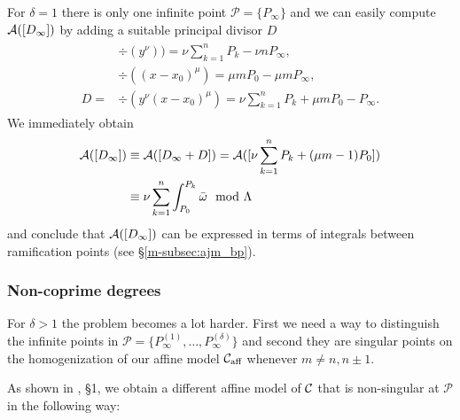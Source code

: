 \documentclass[main.tex]{subfiles}
\begin{document}
  For $\delta = 1$ there is only one infinite point $\mathcal{P} = \{ P_{\infty} \}$ and
  we can easily compute  $\mathcal{A}( [D_{\infty}] )$ by adding a suitable
  principal divisor $D$
    \begin{align}
     \begin{split}
      &\div(y^{\nu}) ) =  \nu \sum_{k = 1}^n P_k - \nu n P_{\infty},\\
      &\div((x-x_0)^{\mu})  =  \mu m P_0 - \mu m P_{\infty} ,\\
      D  =  & \div(y^{\nu}(x-x_0)^{\mu})  = \nu \sum_{k = 1}^n P_k + \mu m P_0 - P_{\infty}.
     \end{split}
    \end{align}
    We immediately obtain
    \begin{align}
     \mathcal{A}( [D_{\infty}] )  & \equiv  \mathcal{A}([D_{\infty} + D])  =  \mathcal{A}( [ \nu \sum_{k = 1}^n P_k + (\mu m - 1) P_0 ]  ) \\ & 
      \equiv   \nu \sum_{k=1}^n \int_{P_0}^{P_k} \bar{\omega} \mod \Lambda
    \end{align}
    and conclude that $\mathcal{A}( [D_{\infty}] )$ can be expressed in terms of integrals between
    ramification points (see \S \ref{m-subsec:ajm_bp}).
   
 \subsubsection{Non-coprime degrees}\label{subsec:ajm_inf_ncop}

  For $\delta > 1$ the problem becomes a lot harder. First we need a way to distinguish the infinite points in $\mathcal{P}
  = \{ P_{\infty}^{(1)},\dots, P_{\infty}^{(\delta)} \}$ and second they are singular points
  on the homogenization of our affine model $\mathcal{C}_{\text{aff}}$
  whenever $m \ne n,n\pm1$.
  
  As shown in \cite{CT1996}, \S 1, we obtain a different affine model of $\mathcal{C}$ that is non-singular at $\mathcal{P}$
  in the following way:
  
\end{document}
